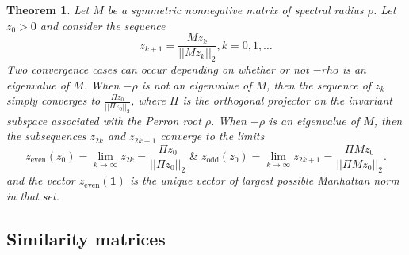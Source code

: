 \documentclass[a4paper,11pt]{report}
\newtheorem{theorem}{Theorem}[section]
\begin{document}
 \begin{theorem}
   Let $M$ be a symmetric nonnegative matrix of spectral radius $\rho$. Let $z_0 > 0$ 
   and consider the sequence
   $$z_{k+1} = \frac{Mz_k}{||Mz_k||_2}, k = 0,1,\ldots$$
   Two convergence cases can occur depending on whether or not $-rho$ is an 
   eigenvalue of $M$. When $-\rho$ is not an eigenvalue of $M$, then the 
   sequence of $z_k$ simply converges to 
   $\frac{\Pi z_0}{||\Pi z_0||_2}$, where $\Pi$ is the orthogonal projector on the 
   invariant subspace associated with the Perron root $\rho$. When $-\rho$ is an 
   eigenvalue of $M$, then the subsequences $z_{2k}$ and $z_{2k+1}$ converge to 
   the limits
   $$z_{\text{even}}(z_0) = \lim_{k \to \infty} z_{2k}  = \frac{\Pi z_0}{||\Pi z_0||_2} \; \& \; z_{\text{odd}}(z_0) = \lim_{k \to \infty} z_{2k+1} = \frac{\Pi M z_0}{||\Pi M z_0||_2}.$$
and the vector $z_{\text{even}}(\mathbf{1})$ is the unique vector of largest 
possible Manhattan norm in that set. \end{theorem}



\subsection{Similarity matrices}
\end{document}
